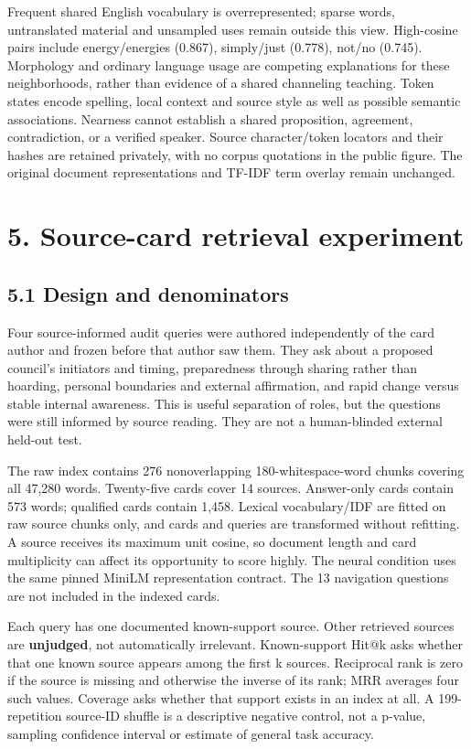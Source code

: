 \documentclass[
  10pt,
]{article}
\begin{document}
Frequent shared English vocabulary is overrepresented; sparse words,
untranslated material and unsampled uses remain outside this view.
High-cosine pairs include energy/energies (0.867), simply/just (0.778),
not/no (0.745). Morphology and ordinary language usage are competing
explanations for these neighborhoods, rather than evidence of a shared
channeling teaching. Token states encode spelling, local context and
source style as well as possible semantic associations. Nearness cannot
establish a shared proposition, agreement, contradiction, or a verified
speaker. Source character/token locators and their hashes are retained
privately, with no corpus quotations in the public figure. The original
document representations and TF-IDF term overlay remain unchanged.

\section{5. Source-card retrieval
experiment}\label{source-card-retrieval-experiment}

\subsection{5.1 Design and denominators}\label{design-and-denominators}

Four source-informed audit queries were authored independently of the
card author and frozen before that author saw them. They ask about a
proposed council's initiators and timing, preparedness through sharing
rather than hoarding, personal boundaries and external affirmation, and
rapid change versus stable internal awareness. This is useful separation
of roles, but the questions were still informed by source reading. They
are not a human-blinded external held-out test.

The raw index contains 276 nonoverlapping 180-whitespace-word chunks
covering all 47,280 words. Twenty-five cards cover 14 sources.
Answer-only cards contain 573 words; qualified cards contain 1,458.
Lexical vocabulary/IDF are fitted on raw source chunks only, and cards
and queries are transformed without refitting. A source receives its
maximum unit cosine, so document length and card multiplicity can affect
its opportunity to score highly. The neural condition uses the same
pinned MiniLM representation contract. The 13 navigation questions are
not included in the indexed cards.

Each query has one documented known-support source. Other retrieved
sources are \textbf{unjudged}, not automatically irrelevant.
Known-support Hit@k asks whether that one known source appears among the
first k sources. Reciprocal rank is zero if the source is missing and
otherwise the inverse of its rank; MRR averages four such values.
Coverage asks whether that support exists in an index at all. A
199-repetition source-ID shuffle is a descriptive negative control, not
a p-value, sampling confidence interval or estimate of general task
accuracy.
\end{document}
